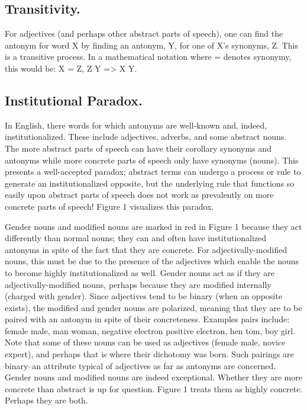 \subsection {Transitivity.} For adjectives (and perhaps other abstract parts of speech), one can find the antonym for word X by finding an antonym, Y, for one of X’s synonyms, Z.  This is a transitive process.  In a mathematical notation where = denotes synonymy, this would be: X = Z, Z \opp Y => X \opp Y.

\subsection {Institutional Paradox.} In English, there words for which antonyms are well-known and, indeed, institutionalized.  These include adjectives, adverbs, and some abstract nouns.  The more abstract parts of speech can have their corollary synonyms and antonyms while more concrete parts of speech only have synonyms (nouns). This presents a well-accepted paradox; abstract terms can undergo a process or rule to generate an institutionalized opposite, but the underlying rule that functions so easily upon abstract parts of speech does not work as prevalently on more concrete parts of speech!  Figure 1 visualizes this paradox.

Gender nouns and modified nouns are marked in red in Figure 1 because they act differently than normal nouns; they can and often have institutionalized antonyms in spite of the fact that they are concrete.  For adjectivally-modified nouns, this must be due to the presence of the adjectives which enable the nouns to become highly institutionalized as well.  Gender nouns act as if they are adjectivally-modified nouns, perhaps because they are modified internally (charged with gender).  Since adjectives tend to be binary (when an opposite exists), the modified and gender nouns are polarized, meaning that they are to be paired with an antonym in spite of their concreteness.  Examples pairs include: female \opp male, man \opp woman, negative electron \opp positive electron, hen \opp tom, boy \opp girl.  Note that some of these nouns can be used as adjectives (female \opp male, novice \opp expert), and perhaps that is where their dichotomy was born.  Such pairings are binary--an attribute typical of adjectives as far as antonyms are concerned.  Gender nouns and modified nouns are indeed exceptional.  Whether they are more concrete than abstract is up for question.  Figure 1 treats them as highly concrete.  Perhaps they are both.    


